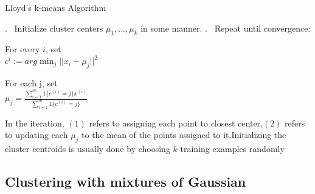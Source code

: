 \documentclass[12pt]{article}
\begin{document}
 \begin{algorithm}
 	
 	\caption*{Lloyd's k-means Algorithm} \label{alg:MyAlgorithm}
 	\begin{algorithmic}
 		
 		. \ Initialize cluster centers $\mu_{1},...,\mu_{k}$ in some manner.
 		. \ Repeat until convergence:
 		
 		
 		
 		
 		
 		\STATE \hspace{ 0.8cm} For every $i$, set  \\  \hspace{4cm}$c^{i} := arg \min_{j}   \vert \vert x_{i} - \mu_{j} \vert \vert ^{2} $
 		
 		\STATE \hspace{ 0.8cm} For each j, set \\  \hspace{4 cm}$\mu_{j} = \frac{\sum_{i=1}^{m} 1 \{c^{(i)}=j\}x^{(i)}}{\sum_{i=1}^{m} 1 \{c^{(i)}=j\}}$
 		
 		
 		
 		
 		
 	\end{algorithmic}
 \end{algorithm}
 
 
 
In the iteration, $(1)$ refers to assigning each point to closest center,$(2)$ refers to updating each $\mu_{j}$ to the mean of the points assigned to it.Initializing the cluster centroids is usually done by choosing $k$ training examples randomly
 
 
  

 \subsection{Clustering with mixtures of Gaussian}
 
\end{document}

